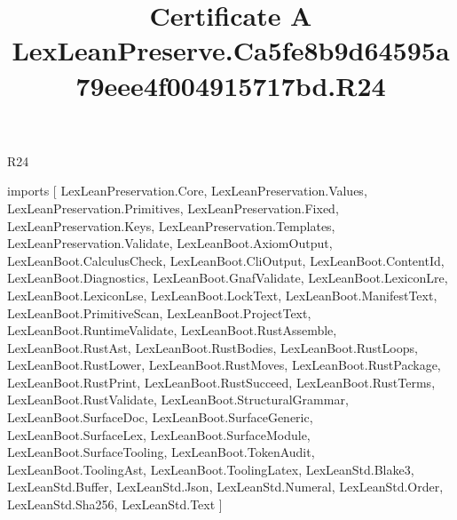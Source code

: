 \begin{lexlean}{R24}
\title{Certificate A LexLeanPreserve.Ca5fe8b9d64595a79eee4f004915717bd.R24}
\begin{coremodule}
imports [
  LexLeanPreservation.Core,
  LexLeanPreservation.Values,
  LexLeanPreservation.Primitives,
  LexLeanPreservation.Fixed,
  LexLeanPreservation.Keys,
  LexLeanPreservation.Templates,
  LexLeanPreservation.Validate,
  LexLeanBoot.AxiomOutput,
  LexLeanBoot.CalculusCheck,
  LexLeanBoot.CliOutput,
  LexLeanBoot.ContentId,
  LexLeanBoot.Diagnostics,
  LexLeanBoot.GnafValidate,
  LexLeanBoot.LexiconLre,
  LexLeanBoot.LexiconLse,
  LexLeanBoot.LockText,
  LexLeanBoot.ManifestText,
  LexLeanBoot.PrimitiveScan,
  LexLeanBoot.ProjectText,
  LexLeanBoot.RuntimeValidate,
  LexLeanBoot.RustAssemble,
  LexLeanBoot.RustAst,
  LexLeanBoot.RustBodies,
  LexLeanBoot.RustLoops,
  LexLeanBoot.RustLower,
  LexLeanBoot.RustMoves,
  LexLeanBoot.RustPackage,
  LexLeanBoot.RustPrint,
  LexLeanBoot.RustSucceed,
  LexLeanBoot.RustTerms,
  LexLeanBoot.RustValidate,
  LexLeanBoot.StructuralGrammar,
  LexLeanBoot.SurfaceDoc,
  LexLeanBoot.SurfaceGeneric,
  LexLeanBoot.SurfaceLex,
  LexLeanBoot.SurfaceModule,
  LexLeanBoot.SurfaceTooling,
  LexLeanBoot.TokenAudit,
  LexLeanBoot.ToolingAst,
  LexLeanBoot.ToolingLatex,
  LexLeanStd.Blake3,
  LexLeanStd.Buffer,
  LexLeanStd.Json,
  LexLeanStd.Numeral,
  LexLeanStd.Order,
  LexLeanStd.Sha256,
  LexLeanStd.Text
]


\end{coremodule}
\end{lexlean}
